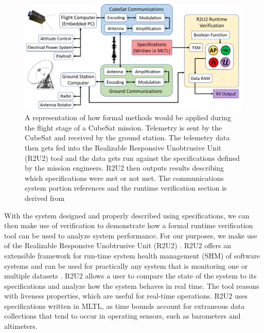 \documentclass[conf]{new-aiaa}
\begin{document}
\begin{figure}[!ht]
\includegraphics[width=1.0\textwidth]{Fig/SciTech2.png}
\caption{A representation of how formal methods would be applied during the flight stage of a CubeSat mission. Telemetry is sent by the CubeSat and received by the ground station. The telemetry data then gets fed into the Realizable Responsive Unobtrusive Unit (R2U2) tool and the data gets run against the specifications defined by the mission engineers. R2U2 then outputs results describing which specifications were met or not met. The communications system portion references \cite{Asundi2013} and the runtime verification section is derived from}
\label{Diagram}
\end{figure}

With the system designed and properly described using specifications, we can then make use of verification to demonstrate how a formal runtime verification tool can be used to analyze system performance. For our purposes, we make use of the Realizable Responsive Unobtrusive Unit (R2U2) \cite{RS17}. R2U2 offers an extensible framework for run-time system health management (SHM) of software systems and can be used for practically any system that is monitoring one or multiple datasets \cite{MRS17,RS17}. R2U2 allows a user to compare the state of the system to its specifications and analyze how the system behaves in real time. The tool reasons with liveness properties, which are useful for real-time operations. R2U2 uses specifications written in MLTL, as time bounds account for extraneous data collections that tend to occur in operating sensors, such as barometers and altimeters.\\
\end{document}
